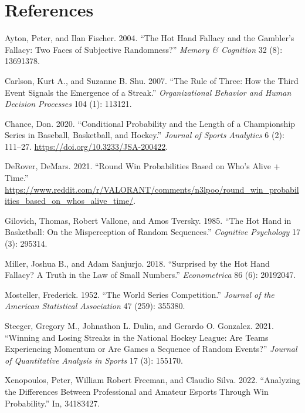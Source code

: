 \documentclass{article}
\newlength{\cslhangindent}
\newlength{\cslentryspacingunit} %
\newenvironment{CSLReferences}[2] %
 {%
  \setlength{\parindent}{0pt}
  \ifodd #1
  \let\oldpar\par
  \def\par{\hangindent=\cslhangindent\oldpar}
  \fi
  \setlength{\parskip}{#2\cslentryspacingunit}
 }%
 {}
\begin{document}
\hypertarget{references}{%
\section*{References}\label{references}}

\hypertarget{refs}{}
\begin{CSLReferences}{1}{0}
\leavevmode{}%
Ayton, Peter, and Ilan Fischer. 2004. {``The Hot Hand Fallacy and the
Gambler{'}s Fallacy: Two Faces of Subjective Randomness?''} \emph{Memory
\& Cognition} 32 (8): 13691378.

\leavevmode{}%
Carlson, Kurt A., and Suzanne B. Shu. 2007. {``The Rule of Three: How
the Third Event Signals the Emergence of a Streak.''}
\emph{Organizational Behavior and Human Decision Processes} 104 (1):
113121.

\leavevmode{}%
Chance, Don. 2020. {``Conditional Probability and the Length of a
Championship Series in Baseball, Basketball, and Hockey.''}
\emph{Journal of Sports Analytics} 6 (2): 111--27.
\url{https://doi.org/10.3233/JSA-200422}.

\leavevmode{}%
DeRover, DeMars. 2021. {``Round Win Probabilities Based on Who's Alive +
Time.''}
\url{https://www.reddit.com/r/VALORANT/comments/n3lpoo/round_win_probabilities_based_on_whos_alive_time/}.

\leavevmode{}%
Gilovich, Thomas, Robert Vallone, and Amos Tversky. 1985. {``The Hot
Hand in Basketball: On the Misperception of Random Sequences.''}
\emph{Cognitive Psychology} 17 (3): 295314.

\leavevmode{}%
Miller, Joshua B., and Adam Sanjurjo. 2018. {``Surprised by the Hot Hand
Fallacy? A Truth in the Law of Small Numbers.''} \emph{Econometrica} 86
(6): 20192047.

\leavevmode{}%
Mosteller, Frederick. 1952. {``The World Series Competition.''}
\emph{Journal of the American Statistical Association} 47 (259): 355380.

\leavevmode{}%
Steeger, Gregory M., Johnathon L. Dulin, and Gerardo O. Gonzalez. 2021.
{``Winning and Losing Streaks in the National Hockey League: Are Teams
Experiencing Momentum or Are Games a Sequence of Random Events?''}
\emph{Journal of Quantitative Analysis in Sports} 17 (3): 155170.

\leavevmode{}%
Xenopoulos, Peter, William Robert Freeman, and Claudio Silva. 2022.
{``Analyzing the Differences Between Professional and Amateur Esports
Through Win Probability.''} In, 34183427.

\end{CSLReferences}



\end{document}
